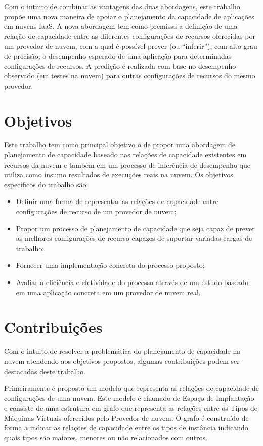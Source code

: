 Com o intuito de combinar as vantagens das duas abordagens, este trabalho
propõe uma nova maneira de apoiar o planejamento da capacidade de aplicações
em nuvens IaaS. A nova abordagem tem como premissa a definição de uma relação 
de capacidade entre as diferentes configurações de recursos oferecidas por um 
provedor de nuvem, com a qual é possível prever (ou ``inferir''), com alto grau 
de precisão, o desempenho esperado de uma aplicação para determinadas configurações 
de recursos. A predição é realizada com base no desempenho observado (em testes 
na nuvem) para outras configurações de recursos do mesmo provedor.

\section{Objetivos}
Este trabalho tem como principal objetivo o de propor uma abordagem de
planejamento de capacidade baseado nas relações de capacidade existentes em
recursos da nuvem e também em um processo de inferência de desempenho 
que utiliza como insumo resultados de execuções reais na nuvem. Os objetivos
específicos do trabalho são:

\begin{itemize}
  \item Definir uma forma de representar as relações de capacidade entre
  configurações de recurso de um provedor de nuvem;
  \item Propor um processo de planejamento de capacidade que seja capaz de 
  prever as melhores configurações de recurso capazes de suportar variadas
  cargas de trabalho;
  \item Fornecer uma implementação concreta do processo proposto;
  \item Avaliar a eficiência e efetividade do processo através de um estudo
  baseado em uma aplicação concreta em um provedor de nuvem real.
\end{itemize}
 
\section{Contribuições}
Com o intuito de resolver a problemática do planejamento de capacidade na nuvem
atendendo aos objetivos propostos, algumas contribuições podem ser destacadas
deste trabalho.

Primeiramente é proposto um modelo que representa as relações de capacidade de
configurações de uma nuvem. Este modelo é chamado de Espaço de Implantação
e consiste de uma estrutura em grafo que representa as relações entre os
Tipos de Máquinas Virtuais oferecidos pelo Provedor de nuvem. O grafo é
construído de forma a indicar as relações de capacidade entre os tipos de
instância indicando quais tipos são maiores, menores ou não relacionados com
outros.

